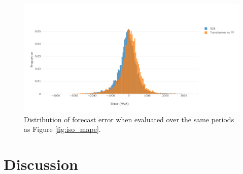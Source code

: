 \begin{figure}[htbp]
	\centerline{\includegraphics[width=.9\textwidth]{images/iso_hist.pdf}}
	\caption{Distribution of forecast error when evaluated over the same periods as Figure \ref{fig:iso_mape}.}
	\label{fig:iso_hist}
\end{figure}


\section{Discussion}